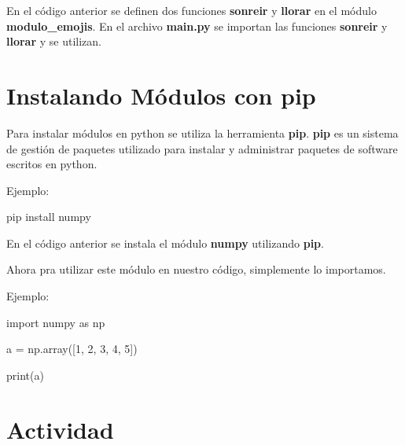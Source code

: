 \documentclass[
  a4paper,
  DIV=11,
  numbers=noendperiod,
  onepage,
  openany]{scrreprt}
\newenvironment{Shaded}{\begin{snugshade}}{\end{snugshade}}
\newcommand{\BuiltInTok}[1]{\textcolor[rgb]{0.00,0.23,0.31}{#1}}
\newcommand{\DecValTok}[1]{\textcolor[rgb]{0.68,0.00,0.00}{#1}}
\newcommand{\ExtensionTok}[1]{\textcolor[rgb]{0.00,0.23,0.31}{#1}}
\newcommand{\ImportTok}[1]{\textcolor[rgb]{0.00,0.46,0.62}{#1}}
\newcommand{\NormalTok}[1]{\textcolor[rgb]{0.00,0.23,0.31}{#1}}
\newcommand{\OperatorTok}[1]{\textcolor[rgb]{0.37,0.37,0.37}{#1}}
\begin{document}
En el código anterior se definen dos funciones \textbf{sonreir} y
\textbf{llorar} en el módulo \textbf{modulo\_emojis}. En el archivo
\textbf{main.py} se importan las funciones \textbf{sonreir} y
\textbf{llorar} y se utilizan.

\section{Instalando Módulos con
pip}\label{instalando-muxf3dulos-con-pip}

Para instalar módulos en python se utiliza la herramienta \textbf{pip}.
\textbf{pip} es un sistema de gestión de paquetes utilizado para
instalar y administrar paquetes de software escritos en python.

Ejemplo:

\begin{Shaded}
\begin{Highlighting}[]
\ExtensionTok{pip}\NormalTok{ install numpy}
\end{Highlighting}
\end{Shaded}

En el código anterior se instala el módulo \textbf{numpy} utilizando
\textbf{pip}.

Ahora pra utilizar este módulo en nuestro código, simplemente lo
importamos.

Ejemplo:

\begin{Shaded}
\begin{Highlighting}[]
\ImportTok{import}\NormalTok{ numpy }\ImportTok{as}\NormalTok{ np}

\NormalTok{a }\OperatorTok{=}\NormalTok{ np.array([}\DecValTok{1}\NormalTok{, }\DecValTok{2}\NormalTok{, }\DecValTok{3}\NormalTok{, }\DecValTok{4}\NormalTok{, }\DecValTok{5}\NormalTok{])}

\BuiltInTok{print}\NormalTok{(a)}
\end{Highlighting}
\end{Shaded}

\section{Actividad}\label{actividad-5}
\end{document}
